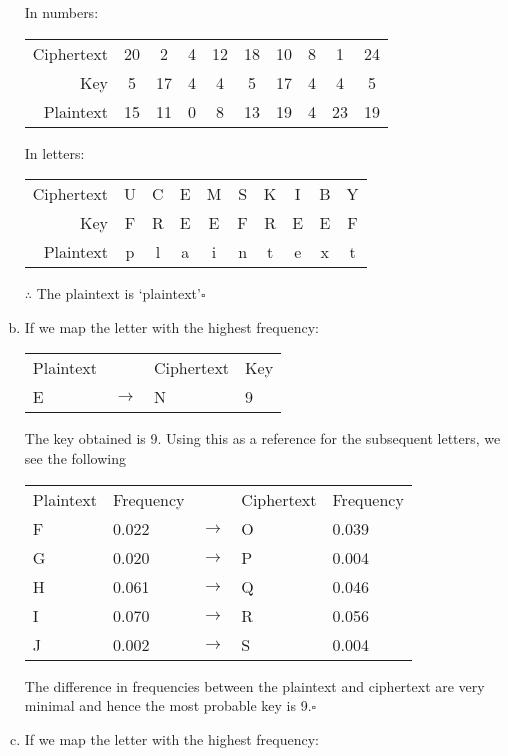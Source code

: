 \documentclass[12pt]{article}
\newcommand{\EOQ}{\hfill $\square$}
\begin{document}
\begin{enumerate}[(a)]
In numbers:
\begin{table}[H]
\centering
\begin{tabular}{r|ccccccccc}
Ciphertext & 20 & 2  & 4 & 12 & 18 & 10 & 8 & 1  & 24 \\
Key        & 5  & 17 & 4 & 4  & 5  & 17 & 4 & 4  & 5  \\ \hline
Plaintext  & 15 & 11 & 0 & 8  & 13 & 19 & 4 & 23 & 19
\end{tabular}
\end{table}
In letters:\\\begin{table}[H]
\centering
\begin{tabular}{r|ccccccccc}
Ciphertext & U & C & E & M & S & K & I & B & Y \\
Key        & F & R & E & E & F & R & E & E & F \\ \hline
Plaintext  & p & l & a & i & n & t & e & x & t
\end{tabular}
\end{table}
$\therefore$ The plaintext is `plaintext'\EOQ
\item If we map the letter with the highest frequency:
\begin{table}[H]
\centering
\begin{tabular}{llll}
Plaintext &   & Ciphertext & Key \\
E         & $\rightarrow$ & N          & 9  
\end{tabular}
\end{table}
The key obtained is 9. Using this as a reference for the subsequent letters, we see the following
\begin{table}[H]
\centering
\begin{tabular}{lllll}
Plaintext & Frequency &   & Ciphertext & Frequency \\
F         & 0.022     & $\rightarrow$ & O          & 0.039     \\
G         & 0.020     & $\rightarrow$ & P          & 0.004     \\
H         & 0.061     & $\rightarrow$ & Q          & 0.046     \\
I         & 0.070     & $\rightarrow$ & R          & 0.056     \\
J         & 0.002     & $\rightarrow$ & S          & 0.004    
\end{tabular}
\end{table}
The difference in frequencies between the plaintext and ciphertext are very minimal and hence the most probable key is 9.\EOQ
\item If we map the letter with the highest frequency:

\end{enumerate}
\end{document}
